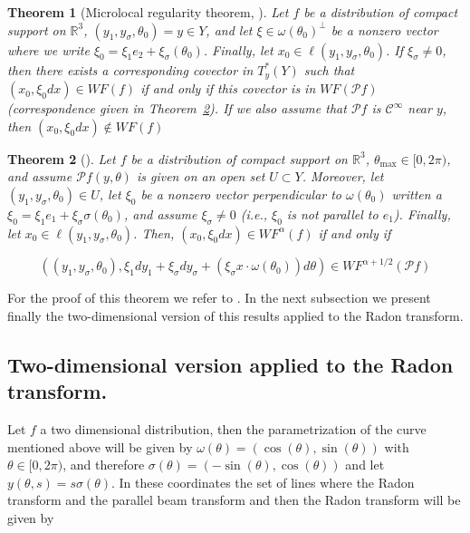 \documentclass[a4paper]{article}
\newtheorem{theorem}{Theorem}
\begin{document}
\begin{theorem}[Microlocal regularity theorem, \cite{Ozan-tomography}]
\label{thm:Ozan_second}
Let $f$ be a distribution of compact support on $\mathbb{R}^3$, $(y_1,y_{\sigma},\theta_0)=y\in Y$, and let $\xi\in \omega(\theta_0)^{\perp}$ be a nonzero vector where we write $\xi_0=\xi_1e_2+\xi_{\sigma}(\theta_0)$. Finally, let $x_0\in\ell(y_1,y_{\sigma},\theta_0)$. If $\xi_{\sigma}\neq 0$, then there exists a corresponding covector in $T^*_y(Y)$ such that $(x_0,\xi_0dx)\in WF(f)$ if and only if this covector is in $WF(\mathcal{P}f)$ (correspondence given in Theorem~\ref{thm:Ozan_main}). If we also assume that $\mathcal{P}f$ is $\mathcal{C}^{\infty}$ near $y$, then $(x_0,\xi_0dx)\not\in WF(f)$

\end{theorem}

\bigskip

\begin{theorem}[\cite{Ozan-tomography}]
\label{thm:Ozan_main}
Let $f$ be a distribution of compact support on $\mathbb{R}^3$, $\theta_{\max}\in [0,2\pi)$, and assume $\mathcal{P}f(y,\theta)$ is given on an open set $U\subset Y$. Moreover, let $(y_1,y_{\sigma},\theta_0)\in U$, let $\xi_0$ be a nonzero  vector perpendicular to $\omega(\theta_0)$ written a $\xi_0=\xi_1 e_1+\xi_{\sigma}\sigma(\theta_0)$, and assume $\xi_{\sigma}\neq 0$ (i.e., $\xi_0$ is not parallel to $e_1$). Finally, let $x_0\in \ell(y_1,y_{\sigma},\theta_0)$. Then, $(x_0, \xi_0 dx)\in WF^{\alpha}(f)$ if and only if

$$
((y_1,y_{\sigma},\theta_0), \xi_1dy_1+\xi_{\sigma}dy_{\sigma}+(\xi_{\sigma}x\cdot \omega(\theta_0))d\theta)\in WF^{\alpha+1/2}(\mathcal{P}f)
$$
\end{theorem}

For the proof of this theorem we refer to \cite{Ozan-tomography}. In the next subsection we present finally the two-dimensional version of this results applied to the Radon transform.

\subsection{Two-dimensional version applied to the Radon transform.}

Let $f$ a two dimensional distribution, then the parametrization of the curve mentioned above will be given by $\omega(\theta)=(\cos(\theta),\sin(\theta))$ with $\theta\in [0,2\pi)$, and therefore $\sigma(\theta)=(-\sin(\theta),\cos(\theta))$ and let $y(\theta,s)=s\sigma(\theta)$. In these coordinates the set of lines where the Radon transform and the parallel beam transform and then the Radon transform will be given by 
\end{document}
